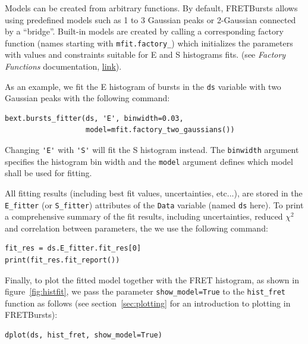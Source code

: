 \documentclass[10pt,letterpaper]{article}
\begin{document}
Models can be created from arbitrary functions. By default,
FRETBursts allows using predefined models such as 1 to 3 Gaussian
peaks or 2-Gaussian connected by a ``bridge''.
Built-in models are created by calling a corresponding factory function
(names starting with \verb|mfit.factory_|) which initializes the parameters
with values and constraints suitable for E and S histograms fits.
(see \textit{Factory Functions} documentation,
\href{http://fretbursts.readthedocs.org/en/latest/mfit.html#model-factory-functions}{link}).

As an example, we fit the E histogram of bursts in the
\verb|ds| variable with two Gaussian peaks with the following command:

\begin{lstlisting}
bext.bursts_fitter(ds, 'E', binwidth=0.03,
                   model=mfit.factory_two_gaussians())
\end{lstlisting}

Changing \verb|'E'| with \verb|'S'| will fit the S histogram instead.
The \verb|binwidth| argument specifies the histogram bin width and
the \verb|model| argument defines which model shall be used for
fitting.

All fitting results (including best fit values, uncertainties, etc...),
are stored in the \verb|E_fitter| (or \verb|S_fitter|)
attributes of the \verb|Data| variable (named \verb|ds| here).
To print a comprehensive summary of the fit results, including
uncertainties, reduced $\chi^2$ and correlation between parameters,
the we use the following command:

\begin{lstlisting}
fit_res = ds.E_fitter.fit_res[0]
print(fit_res.fit_report())
\end{lstlisting}

Finally, to plot the fitted model together with the FRET histogram, 
as shown in figure~\ref{fig:histfit}, we pass the parameter \verb|show_model=True|
to the \verb|hist_fret| function as follows
(see section~\ref{sec:plotting} for an introduction to plotting in FRETBursts):

\begin{lstlisting}
dplot(ds, hist_fret, show_model=True)
\end{lstlisting}
\end{document}
